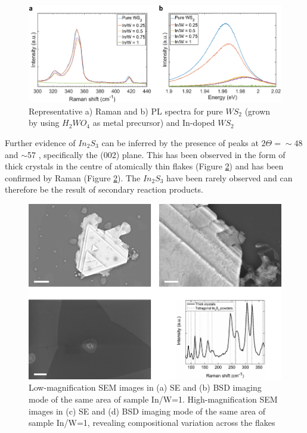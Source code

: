 \begin{figure}[H]
	\begin{center}
		\includegraphics[scale=0.5]{In/RamanPL.png}
		\caption{Representative a) Raman and b) PL spectra for pure $WS_2$ (grown by using $H_2WO_4$ as metal precursor) and In-doped $WS_2$}
		\label{fig:InRamanPL}
	\end{center}
\end{figure}

Further evidence of $In_2S_3$ can be inferred by the presence of peaks at $2\Theta ={\sim}48$ and $\sim$57 \cite{Hahn1949}, specifically the (002) plane. This has been observed in the form of thick crystals in the centre of atomically thin flakes (Figure \ref{fig:InSEMCentre}) and has been confirmed by Raman (Figure \ref{fig:InSEMCentre}). The $In_2S_3$ have been rarely observed and can therefore be the result of secondary reaction products.

\begin{figure}[!h]
	\begin{center}
		\includegraphics[scale=0.5]{In/SEMCentre.png}
		\caption{Low-magnification SEM images in (a) SE and (b) BSD imaging mode of the same area of sample In/W=1. High-magnification SEM images in (c) SE and (d) BSD imaging mode of the same area of sample In/W=1, revealing compositional variation across the flakes}
		\label{fig:InSEMCentre}
	\end{center}
\end{figure}

